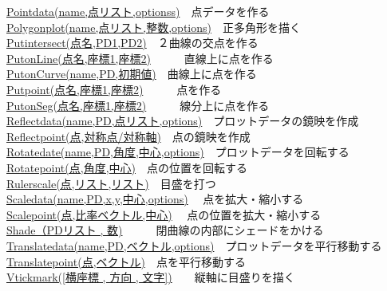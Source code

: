 \documentclass[papersize,a4paper,12pt,uplatex]{jsarticle}
\begin{document}
\begin{tabbing}
\hyperlink{pointdata}{Pointdata(name,点リスト,optionss)}　\>点データを作る\\
\hyperlink{polygonplot}{Polygonplot(name,点リスト,整数,options)}　\>正多角形を描く\\
\hyperlink{putintersect}{Putintersect(点名,PD1,PD2)}　\>２曲線の交点を作る\\
\hyperlink{putline}{PutonLine(点名,座標1,座標2)}　　　\>直線上に点を作る\\
\hyperlink{putoncurve}{PutonCurve(name,PD,初期値)}　\>曲線上に点を作る\\
\hyperlink{putpoint}{Putpoint(点名,座標1,座標2)}　　　\>点を作る\\
\hyperlink{putseg}{PutonSeg(点名,座標1,座標2)}　　　\>線分上に点を作る\\
\hyperlink{reflectdata}{Reflectdata(name,PD,点リスト,options)}　\>プロットデータの鏡映を作成\\
\hyperlink{reflectpoint}{Reflectpoint(点,対称点/対称軸)}　\>点の鏡映を作成\\
\hyperlink{rotatedata}{Rotatedate(name,PD,角度,中心,options)}　\>プロットデータを回転する\\
\hyperlink{rotatepoint}{Rotatepoint(点,角度,中心)}　\>点の位置を回転する\\
\hyperlink{rulerscale}{Rulerscale(点,リスト,リスト)}　\>目盛を打つ\\
\hyperlink{scaldedata}{Scaledata(name,PD,x,y,中心,options)} 　\>点を拡大・縮小する\\
\hyperlink{scalepoint}{Scalepoint(点,比率ベクトル,中心)} 　\>点の位置を拡大・縮小する\\
\hyperlink{shade}{Shade（PDリスト , 数)}　　　\>閉曲線の内部にシェードをかける\\
\hyperlink{translatedata}{Translatedata(name,PD,ベクトル,options)}　\>プロットデータを平行移動する\\
\hyperlink{translatepoint}{Translatepoint(点,ベクトル)}　\>点を平行移動する\\
\hyperlink{vtickmark}{Vtickmark([横座標 , 方向 , 文字])}　　\>縦軸に目盛りを描く\\


\end{tabbing}
\end{document}
